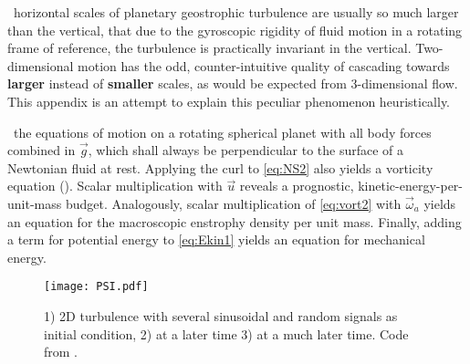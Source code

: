 \label{chap:turbu_categories}
~horizontal scales of planetary geostrophic turbulence are usually so much
larger than the vertical, that due to the gyroscopic rigidity of fluid motion
in a rotating frame of reference, the turbulence is practically invariant in
the vertical. Two-dimensional motion has the odd, counter-intuitive quality of
cascading towards \textbf{larger} instead of \textbf{smaller} scales, as would be
expected from 3-dimensional flow. This appendix is an attempt to explain
this peculiar phenomenon heuristically.


~the equations of motion on a rotating spherical planet with all body forces
combined in $\vec{g}$, which shall always be perpendicular to
the surface of a Newtonian fluid at rest. Applying the curl to \eqref{eq:NS2}
also yields a vorticity equation ().
Scalar multiplication with $\vec{u}$ reveals a prognostic, kinetic-energy-per-unit-mass budget.
Analogously, scalar multiplication of \eqref{eq:vort2} with $\vec{\omega}_{a}$ yields an equation
for the macroscopic enstrophy density per unit mass. Finally, adding a term for potential energy to \eqref{eq:Ekin1} yields an equation for mechanical energy.

\begin{figure}
\texttt{[image: PSI.pdf]}
\caption{1) 2D turbulence with several sinusoidal and random signals as initial condition, 2) at a later time 3) at a much later time. Code from
\citet{Seibold2008a}.}
\label{fig:PSI}
\end{figure}


